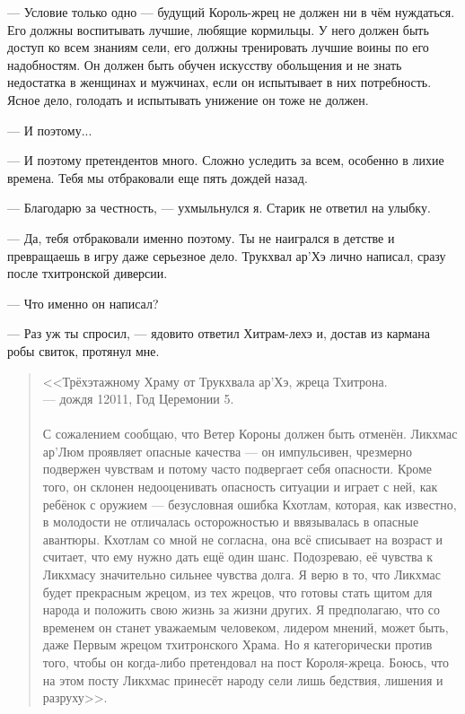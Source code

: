 --- Условие только одно --- будущий Король-жрец не должен ни в чём нуждаться.
Его должны воспитывать лучшие, любящие кормильцы.
У него должен быть доступ ко всем знаниям сели, его должны тренировать лучшие воины по его надобностям.
Он должен быть обучен искусству обольщения и не знать недостатка в женщинах и мужчинах, если он испытывает в них потребность.
Ясное дело, голодать и испытывать унижение он тоже не должен.

--- И поэтому...

--- И поэтому претендентов много.
Сложно уследить за всем, особенно в лихие времена.
Тебя мы отбраковали еще пять дождей назад.

--- Благодарю за честность, --- ухмыльнулся я.
Старик не ответил на улыбку.

--- Да, тебя отбраковали именно поэтому.
Ты не наигрался в детстве и превращаешь в игру даже серьезное дело.
Трукхвал ар'Хэ лично написал, сразу после тхитронской диверсии.

--- Что именно он написал?

--- Раз уж ты спросил, --- ядовито ответил Хитрам-лехэ и, достав из кармана робы свиток, протянул мне.

\begin{quote}
<<Трёхэтажному Храму от Трукхвала ар'Хэ, жреца Тхитрона.\\
--- дождя 12011, Год Церемонии 5.\\
~\\
С сожалением сообщаю, что Ветер Короны должен быть отменён.
Ликхмас ар'Люм проявляет опасные качества --- он импульсивен, чрезмерно подвержен чувствам и потому часто подвергает себя опасности.
Кроме того, он склонен недооценивать опасность ситуации и играет с ней, как ребёнок с оружием --- безусловная ошибка Кхотлам, которая, как известно, в молодости не отличалась осторожностью и ввязывалась в опасные авантюры.
Кхотлам со мной не согласна, она всё списывает на возраст и считает, что ему нужно дать ещё один шанс.
Подозреваю, её чувства к Ликхмасу значительно сильнее чувства долга.
Я верю в то, что Ликхмас будет прекрасным жрецом, из тех жрецов, что готовы стать щитом для народа и положить свою жизнь за жизни других.
Я предполагаю, что со временем он станет уважаемым человеком, лидером мнений, может быть, даже Первым жрецом тхитронского Храма.
Но я категорически против того, чтобы он когда-либо претендовал на пост Короля-жреца.
Боюсь, что на этом посту Ликхмас принесёт народу сели лишь бедствия, лишения и разруху>>.
\end{quote}


